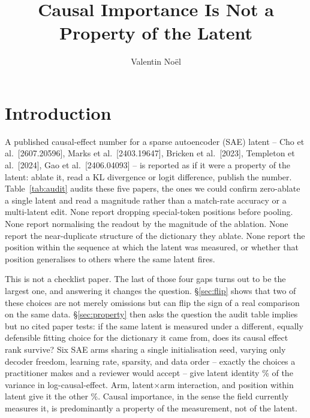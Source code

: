 \documentclass[11pt]{article}
\title{Causal Importance Is Not a Property of the Latent}
\author{Valentin No\"el}
\date{}
\begin{document}
\maketitle

\begin{abstract}
\end{abstract}

\section{Introduction}
A published causal-effect number for a sparse autoencoder (SAE) latent --
Cho et al.\ [2607.20596], Marks et al.\ [2403.19647], Bricken et al.\ [2023],
Templeton et al.\ [2024], Gao et al.\ [2406.04093] -- is reported as if it were
a property of the latent: ablate it, read a KL divergence or logit difference,
publish the number. Table~\ref{tab:audit} audits these five papers, the ones we
could confirm zero-ablate a single latent and read a magnitude rather than a
match-rate accuracy or a multi-latent edit. None report dropping special-token
positions before pooling. None report normalising the readout by the magnitude
of the ablation. None report the near-duplicate structure of the dictionary
they ablate. None report the position within the sequence at which the latent
was measured, or whether that position generalises to others where the same
latent fires.

This is not a checklist paper. The last of those four gaps turns out to be the
largest one, and answering it changes the question. \S\ref{sec:flip} shows that
two of these choices are not merely omissions but can flip the sign of a real
comparison on the same data. \S\ref{sec:property} then asks the question the
audit table implies but no cited paper tests: if the same latent is measured
under a different, equally defensible fitting choice for the dictionary it
came from, does its causal effect rank survive? Six SAE arms sharing a single
initialisation seed, varying only decoder freedom, learning rate, sparsity, and
data order -- exactly the choices a practitioner makes and a reviewer would
accept -- give latent identity \SixArmPctLatent\% of the variance in
log-causal-effect. Arm, latent$\times$arm interaction, and position within
latent give it the other \FigVarianceRest\%. Causal importance, in the sense
the field currently measures it, is predominantly a property of the
measurement, not of the latent.
\end{document}
